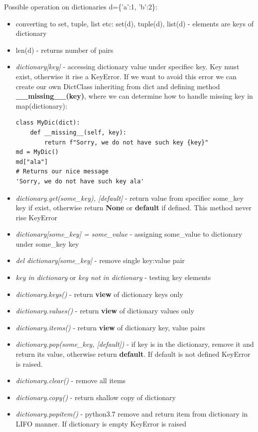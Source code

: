 \documentclass{article}
\begin{document}
Possible operation on dictionaries d=\{'a':1, 'b':2\}:
\begin{itemize}
\item converting to set, tuple, list etc: set(d), tuple(d), list(d) - elements are keys of dictionary
\item len(d) - returns number of pairs
\item \textit{dictionary[key]} - accessing dictionary value under specifiec key. Key must exist, otherwise it rise a \textcolor{pythonerror}{KeyError}. If we want to avoid this error we can create our own DictClass inheriting from dict and defining method \textbf{\_\_missing\_\_(key)}, where we can determine how to handle missing key in map(dictionary):
\begin{lstlisting}[style=pystyle]
class MyDic(dict):
	def __missing__(self, key):
		return f"Sorry, we do not have such key {key}"
md = MyDic()
md["ala"]
# Returns our nice message
'Sorry, we do not have such key ala'
\end{lstlisting}
\item \textit{dictionary.get(some\_key), [default]} - return value from specifiec some\_key key if exist, otherwise return \textbf{None} or \textbf{default} if defined. This method never rise \textcolor{pythonerror}{KeyError}
\item \textit{dictionary[some\_key] = some\_value} - assigning some\_value to dictionary under some\_key key
\item \textit{del dictionary[some\_key]} - remove single key:value pair
\item \textit{key in dictionary} or \textit{key not in dictionary} - testing key elements
\item \textit{dictionary.keys()} - return \textbf{view} of dictionary keys only
\item \textit{dictionary.values()} - return \textbf{view} of dictionary values only
\item \textit{dictionary.items()} - return \textbf{view} of dictionary key, value pairs
\item \textit{dictionary.pop(some\_key, [default])} - if key is in the dictionary, remove it and return its value, otherwise return \textbf{default}. If default is not defined \textcolor{pythonerror}{KeyError} is raised.
\item \textit{dictionary.clear()} - remove all items
\item \textit{dictionary.copy()} - return shallow copy of dictionary
\item \textit{dictionary.popitem()} - python3.7 remove and return item from dictionary in LIFO manner. If dictionary is empty \textcolor{pythonerror}{KeyError} is raised

\end{itemize}
\end{document}
